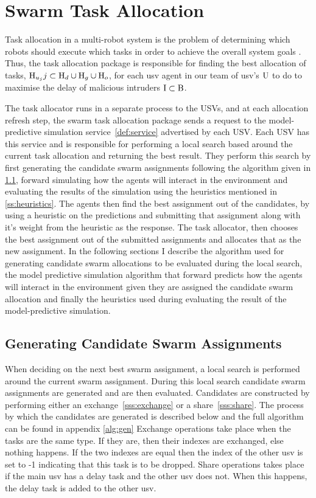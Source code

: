 \documentclass[bsc,frontabs,twoside,singlespacing,parskip,deptreport]{infthesis}     %
\begin{document}
\section{Swarm Task Allocation}
Task allocation in a multi-robot system is the problem of determining which robots should execute which tasks in order to achieve the overall system goals \citep{korsah2013comprehensive}. Thus, the task allocation package is responsible for finding the best allocation of tasks, $\mathrm{H}_{u_{j}}{j} \subset \mathrm{H}_{d} \cup \mathrm{H}_{g} \cup \mathrm{H}_{o}$, for each usv agent in our team of usv's $\mathrm{U}$ to do to maximise the delay of malicious intruders $\mathrm{I} \subset \mathrm{B}$. 

The task allocator runs in a separate process to the USVs, and at each allocation refresh step, the swarm task allocation package sends a request to the model-predictive simulation service~\ref{def:service} advertised by each USV. Each USV has this service and is responsible for performing a local search based around the current task allocation and returning the best result. They perform this search by first generating the candidate swarm assignments following the algorithm given in \ref{ss:generate}, forward simulating how the agents will interact in the environment and evaluating the results of the simulation using the heuristics mentioned in \ref{ss:heuristics}. The agents then find the best assignment out of the candidates, by using a heuristic on the predictions and submitting that assignment along with it's weight from the heuristic as the response. The task allocator, then chooses the best assignment out of the submitted assignments and allocates that as the new assignment. In the following sections I describe the algorithm used for generating candidate swarm allocations to be evaluated during the local search, the model predictive simulation algorithm that forward predicts how the agents will interact in the environment given they are assigned the candidate swarm allocation and finally the heuristics used during evaluating the result of the model-predictive simulation. 

\subsection{Generating Candidate Swarm Assignments}
\label{ss:generate}
When deciding on the next best swarm assignment, a local search is performed around the current swarm assignment. During this local search candidate swarm assignments are generated and are then evaluated. Candidates are constructed by performing either an exchange~\ref{sss:exchange} or a share~\ref{sss:share}. The process by which the candidates are generated is described below and the full algorithm can be found in appendix \ref{alg:gen} Exchange operations take place when the tasks are the same type. If they are, then their indexes are exchanged, else nothing happens. If the two indexes are equal then the index of the other usv is set to -1 indicating that this task is to be dropped. Share operations takes place if the main usv has a delay task and the other usv does not. When this happens, the delay task is added to the other usv.
\end{document}
